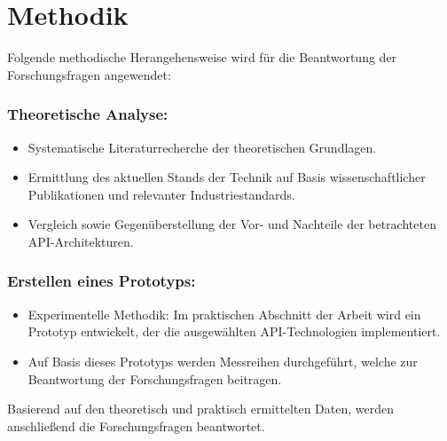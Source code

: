 \section{Methodik}
Folgende methodische Herangehensweise wird für die Beantwortung der Forschungsfragen angewendet:

\subsubsection*{Theoretische Analyse:}
\begin{itemize}
	\item Systematische Literaturrecherche der theoretischen Grundlagen.
	\item Ermittlung des aktuellen Stands der Technik auf Basis wissenschaftlicher Publikationen und relevanter Industriestandards.
	\item Vergleich sowie Gegenüberstellung der Vor- und Nachteile der betrachteten API-Architekturen.
\end{itemize}

\subsubsection*{Erstellen eines Prototyps:}
\begin{itemize}
	\item Experimentelle Methodik: Im praktischen Abschnitt der Arbeit wird ein Prototyp
	entwickelt, der die ausgewählten API-Technologien implementiert.
	\item Auf Basis dieses Prototyps werden Messreihen durchgeführt, welche zur Beantwortung der Forschungsfragen beitragen.
\end{itemize}

Basierend auf den theoretisch und praktisch ermittelten Daten, werden anschließend
die Forschungsfragen beantwortet.
\chapterend
